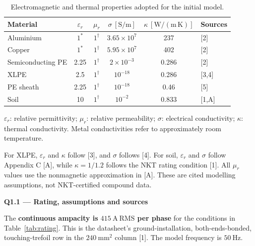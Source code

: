 \documentclass[11pt,a4paper]{article}
\begin{document}
\begin{table}[H]
\centering
\caption{Electromagnetic and thermal properties adopted for the initial model.}
\label{tab:materials}\small
\begin{tabularx}{\linewidth}{@{}Y c c c c l@{}}
\toprule
Material & \(\varepsilon_r\) & \(\mu_r\) &
\(\sigma~[\mathrm{S/m}]\) & \(\kappa~[\mathrm{W/(m\,K)}]\) & Sources\\
\midrule
Aluminium & \(1^\ast\) & \(1^\dagger\) & \(3.65\times10^7\) & 237 & [2]\\
Copper & \(1^\ast\) & \(1^\dagger\) & \(5.95\times10^7\) & 402 & [2]\\
Semiconducting PE & 2.25 & \(1^\dagger\) & \(2\times10^{-3}\) & 0.286 & [2]\\
XLPE & 2.5 & \(1^\dagger\) & \(10^{-18}\) & 0.286 & [3,4]\\
PE sheath & 2.25 & \(1^\dagger\) & \(10^{-18}\) & 0.46 & [5]\\
Soil & 10 & \(1^\dagger\) & \(10^{-2}\) & 0.833 & [1,A]\\
\bottomrule
\end{tabularx}
\end{table}
{\small
\(\varepsilon_r\): relative permittivity; \(\mu_r\): relative permeability;
\(\sigma\): electrical conductivity; \(\kappa\): thermal conductivity.
Metal conductivities refer to approximately room temperature.

For XLPE, \(\varepsilon_r\) and \(\kappa\) follow [3], and \(\sigma\) follows [4].
For soil, \(\varepsilon_r\) and \(\sigma\) follow Appendix C [A], while
\(\kappa=1/1.2\) follows the NKT rating condition [1].
All \(\mu_r\) values use the nonmagnetic approximation in [A].
These are cited modelling assumptions, not NKT-certified compound data.}

\newpage
{\large\bfseries Q1.1 --- Rating, assumptions and sources}\par\medskip

The \textbf{continuous ampacity is \(415~\mathrm{A~RMS}\) per phase} for the
conditions in Table~\ref{tab:rating}. This is the datasheet's ground-installation,
both-ends-bonded, touching-trefoil row in the \(240~\mathrm{mm^2}\) column [1].
The model frequency is \(50~\mathrm{Hz}\).
\end{document}
